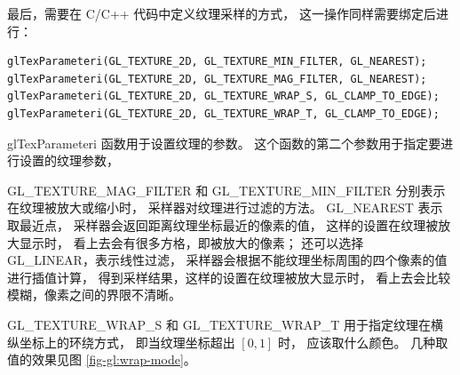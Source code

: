 \documentclass[fontset=windows]{ctexart}
\begin{document}
最后，需要在 C/C++ 代码中定义纹理采样的方式，
这一操作同样需要绑定后进行：

\begin{lstlisting}
glTexParameteri(GL_TEXTURE_2D, GL_TEXTURE_MIN_FILTER, GL_NEAREST);
glTexParameteri(GL_TEXTURE_2D, GL_TEXTURE_MAG_FILTER, GL_NEAREST);
glTexParameteri(GL_TEXTURE_2D, GL_TEXTURE_WRAP_S, GL_CLAMP_TO_EDGE);
glTexParameteri(GL_TEXTURE_2D, GL_TEXTURE_WRAP_T, GL_CLAMP_TO_EDGE);
\end{lstlisting}

glTexParameteri 函数用于设置纹理的参数。
这个函数的第二个参数用于指定要进行设置的纹理参数，

GL\_TEXTURE\_MAG\_FILTER 和 GL\_TEXTURE\_MIN\_FILTER
分别表示在纹理被放大或缩小时，
采样器对纹理进行过滤的方法。
GL\_NEAREST 表示取最近点，
采样器会返回距离纹理坐标最近的像素的值，
这样的设置在纹理被放大显示时，
看上去会有很多方格，即被放大的像素；
还可以选择 GL\_LINEAR，表示线性过滤，
采样器会根据不能纹理坐标周围的四个像素的值进行插值计算，
得到采样结果，这样的设置在纹理被放大显示时，
看上去会比较模糊，像素之间的界限不清晰。

GL\_TEXTURE\_WRAP\_S 和 GL\_TEXTURE\_WRAP\_T
用于指定纹理在横纵坐标上的环绕方式，
即当纹理坐标超出 $[0, 1]$ 时，
应该取什么颜色。
几种取值的效果见图 \ref{fig-gl:wrap-mode}。
\end{document}
